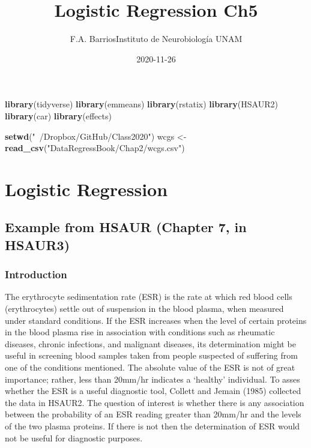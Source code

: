 \documentclass[
]{article}
\title{Logistic Regression Ch5}
\author{F.A. BarriosInstituto de Neurobiología UNAM}
\date{2020-11-26}
\newenvironment{Shaded}{\begin{snugshade}}{\end{snugshade}}
\newcommand{\KeywordTok}[1]{\textcolor[rgb]{0.13,0.29,0.53}{\textbf{#1}}}
\newcommand{\NormalTok}[1]{#1}
\newcommand{\StringTok}[1]{\textcolor[rgb]{0.31,0.60,0.02}{#1}}
\begin{document}
\maketitle

\begin{Shaded}
\begin{Highlighting}[]
\KeywordTok{library}\NormalTok{(tidyverse)}
\KeywordTok{library}\NormalTok{(emmeans)}
\KeywordTok{library}\NormalTok{(rstatix)}
\KeywordTok{library}\NormalTok{(HSAUR2)}
\KeywordTok{library}\NormalTok{(car)}
\KeywordTok{library}\NormalTok{(effects)}

\KeywordTok{setwd}\NormalTok{(}\StringTok{"~/Dropbox/GitHub/Class2020"}\NormalTok{)}
\NormalTok{wcgs <-}\StringTok{ }\KeywordTok{read_csv}\NormalTok{(}\StringTok{"DataRegressBook/Chap2/wcgs.csv"}\NormalTok{)}
\end{Highlighting}
\end{Shaded}

\hypertarget{logistic-regression}{%
\section{Logistic Regression}\label{logistic-regression}}

\hypertarget{example-from-hsaur-chapter-7-in-hsaur3}{%
\subsection{Example from HSAUR (Chapter 7, in
HSAUR3)}\label{example-from-hsaur-chapter-7-in-hsaur3}}

\hypertarget{introduction}{%
\subsubsection{Introduction}\label{introduction}}

The erythrocyte sedimentation rate (ESR) is the rate at which red blood
cells (erythrocytes) settle out of suspension in the blood plasma, when
measured under standard conditions. If the ESR increases when the level
of certain proteins in the blood plasma rise in association with
conditions such as rheumatic diseases, chronic infections, and malignant
diseases, its determination might be useful in screening blood samples
taken from people suspected of suffering from one of the conditions
mentioned. The absolute value of the ESR is not of great importance;
rather, less than 20mm/hr indicates a `healthy' individual. To asses
whether the ESR is a useful diagnostic tool, Collett and Jemain (1985)
collected the data in HSAUR2. The question of interest is whether there
is any association between the probability of an ESR reading greater
than 20mm/hr and the levels of the two plasma proteins. If there is not
then the determination of ESR would not be useful for diagnostic
purposes.
\end{document}
